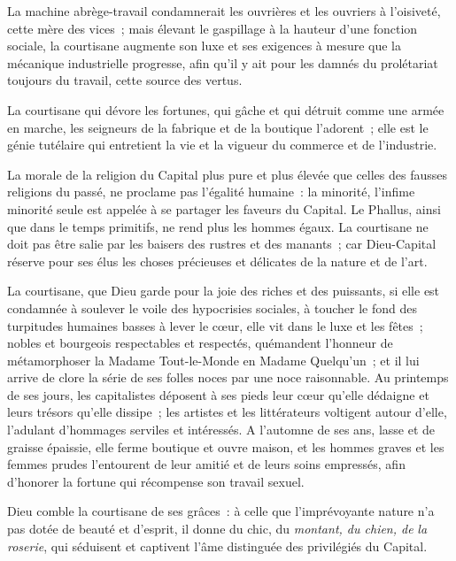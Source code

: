 \documentclass[french,twoside]{book} %
\begin{document}
La machine abrège-travail condamnerait les ouvrières et les ouvriers à l’oisiveté, cette mère des vices ; mais élevant le gaspillage à la hauteur d’une fonction sociale, la courtisane augmente son luxe et ses exigences à mesure que la mécanique industrielle progresse, afin qu’il y ait pour les damnés du prolétariat toujours du travail, cette source des vertus.\par
La courtisane qui dévore les fortunes, qui gâche et qui détruit comme une armée en marche, les seigneurs de la fabrique et de la boutique l’adorent ; elle est le génie tutélaire qui entretient la vie et la vigueur du commerce et de l’industrie.\par
La morale de la religion du Capital plus pure et plus élevée que celles des fausses religions du passé, ne proclame pas l’égalité humaine : la minorité, l’infime minorité seule est appelée à se partager les faveurs du Capital. Le Phallus, ainsi que dans le temps primitifs, ne rend plus les hommes égaux. La courtisane ne doit pas être salie par les baisers des rustres et des manants ; car Dieu-Capital réserve pour ses élus les choses précieuses et délicates de la nature et de l’art.\par
La courtisane, que Dieu garde pour la joie des riches et des puissants, si elle est condamnée à soulever le voile des hypocrisies sociales, à toucher le fond des turpitudes humaines basses à lever le cœur, elle vit dans le luxe et les fêtes ; nobles et bourgeois respectables et respectés, quémandent l’honneur de métamorphoser la Madame Tout-le-Monde en Madame Quelqu’un ; et il lui arrive de clore la série de ses folles noces par une noce raisonnable. Au printemps de ses jours, les capitalistes déposent à ses pieds leur cœur qu’elle dédaigne et leurs trésors qu’elle dissipe ; les artistes et les littérateurs voltigent autour d’elle, l’adulant d’hommages serviles et intéressés. A l’automne de ses ans, lasse et de graisse épaissie, elle ferme boutique et ouvre maison, et les hommes graves et les femmes prudes l’entourent de leur amitié et de leurs soins empressés, afin d’honorer la fortune qui récompense son travail sexuel.\par
Dieu comble la courtisane de ses grâces : à celle que l’imprévoyante nature n’a pas dotée de beauté et d’esprit, il donne du chic, du \emph{montant, du chien, de} \emph{la roserie}, qui séduisent et captivent l’âme distinguée des privilégiés du Capital.\par
\end{document}
